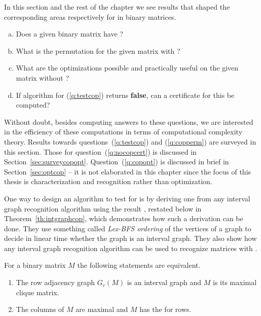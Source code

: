 In this section and the rest of the chapter we see results that shaped the
corresponding areas respectively for \cop in binary matrices.

\begin{enumerate}[a.]
\singlespacing
\item \label{q:testcop} Does a given binary matrix have \COP?
\item \label{q:copperm} What is the \COP permutation for the given matrix with \COP?
\item \label{q:copopt} What are the optimizations possible and practically useful on
  the given matrix without \COP?
\item \label{q:nocopcert} If algorithm for (\ref{q:testcop}) returns
  \textbf{false}, can a certificate for this be computed?
\end{enumerate}

Without doubt, besides computing answers to these questions, we are
interested in the efficiency of these computations in terms of
computational complexity theory. Results towards
questions~(\ref{q:testcop}) and (\ref{q:copperm}) are surveyed in this
section. Those for question~(\ref{q:nocopcert}) is discussed in
Section~\ref{sec:surveycopopt}. Question~(\ref{q:copopt}) is discussed
in brief in Section~\ref{sec:optcop} -- it is not elaborated in this
chapter since the focus of this thesis is characterization and
recognition rather than optimization.

One way to design an algorithm to test for \COP is by deriving one
from any interval graph recognition algorithm using the result
\cite{hmpv00} \cite[Th~2.7]{d08phd}, restated below in
Theorem~\ref{th:intgraphcop}, which demonstrates how such a derivation
can be done.  They use something called {\em Lex-BFS ordering} of the
vertices of a graph to decide in linear time whether the graph is an
interval graph. They also show how any interval graph recognition
algorithm can be used to recognize matrices with \COP. 

\begin{theoremsansproof}
  \label{th:intgraphcop}
  For a binary matrix $M$ the following statements are equivalent.
  \begin{enumerate}
  \item The row adjacency graph $G_r(M)$ is an interval graph and $M$
    is its maximal clique matrix.
  \item The columns of $M$ are maximal and $M$ has the \COP for rows.
  \end{enumerate}
\end{theoremsansproof}


